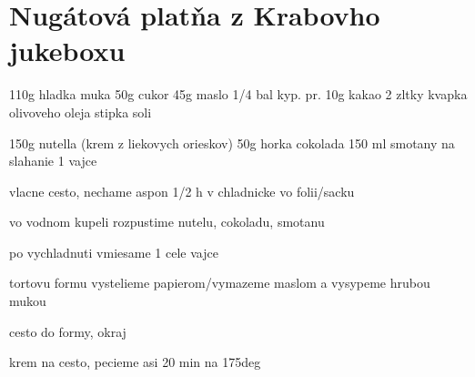 \documentclass[12pt]{article}
\begin{document}
\section*{Nugátová platňa z Krabovho jukeboxu}

110g hladka muka
50g cukor
45g maslo
1/4 bal kyp. pr.
10g kakao
2 zltky
kvapka olivoveho oleja
stipka soli

150g nutella (krem z liekovych orieskov)
50g horka cokolada
150 ml smotany na slahanie
1 vajce

vlacne cesto, nechame aspon 1/2 h v chladnicke vo folii/sacku

vo vodnom kupeli rozpustime nutelu, cokoladu, smotanu

po vychladnuti vmiesame 1 cele vajce

tortovu formu vystelieme papierom/vymazeme maslom a vysypeme hrubou mukou

cesto do formy, okraj

krem na cesto, pecieme asi 20 min na 175deg
\end{document}
